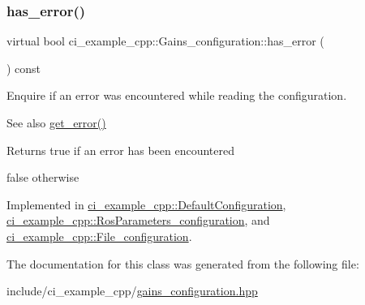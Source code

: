\mbox{\label{classci__example__cpp_1_1Gains__configuration_ae075925f60288519f8a4fcb477453a66}} 
\subsubsection{\texorpdfstring{has\+\_\+error()}{has\_error()}}
{\footnotesize\ttfamily virtual bool ci\+\_\+example\+\_\+cpp\+::\+Gains\+\_\+configuration\+::has\+\_\+error (\begin{DoxyParamCaption}{ }\end{DoxyParamCaption}) const\hspace{0.3cm}{\ttfamily [pure virtual]}}



Enquire if an error was encountered while reading the configuration. 

\begin{DoxySeeAlso}{See also}
\hyperlink{classci__example__cpp_1_1Gains__configuration_a886100ef46082d1b9f8ee169318dc554}{get\+\_\+error()} 
\end{DoxySeeAlso}
\begin{DoxyReturn}{Returns}
true if an error has been encountered 

false otherwise 
\end{DoxyReturn}


Implemented in \hyperlink{classci__example__cpp_1_1DefaultConfiguration_aba675295652a7530bbb2148bec700ab0}{ci\+\_\+example\+\_\+cpp\+::\+Default\+Configuration}, \hyperlink{classci__example__cpp_1_1RosParameters__configuration_afcf30b3c93eb3d215d8dfb852eaaae52}{ci\+\_\+example\+\_\+cpp\+::\+Ros\+Parameters\+\_\+configuration}, and \hyperlink{classci__example__cpp_1_1File__configuration_aa3cae137be3b59e61d13c2a9b1ec8b6a}{ci\+\_\+example\+\_\+cpp\+::\+File\+\_\+configuration}.



The documentation for this class was generated from the following file\+:\begin{DoxyCompactItemize}
\item 
include/ci\+\_\+example\+\_\+cpp/\hyperlink{gains__configuration_8hpp}{gains\+\_\+configuration.\+hpp}\end{DoxyCompactItemize}
